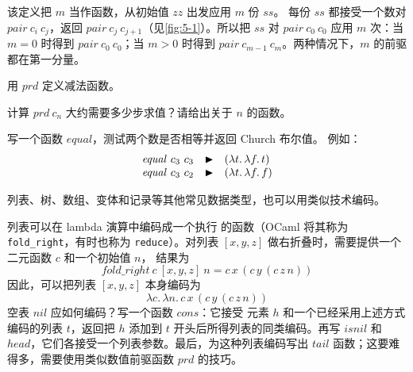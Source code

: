 该定义把 \(m\) 当作函数，从初始值 \(zz\) 出发应用 \(m\) 份 \(ss\)。
每份 \(ss\) 都接受一个数对 \(\mathit{pair}\ c_i\ c_j\)，返回
\(\mathit{pair}\ c_j\ c_{j+1}\)（见\cref{fig:5-1}）。所以把 \(ss\)
对 \(\mathit{pair}\ c_0\ c_0\) 应用 \(m\) 次：当 \(m=0\) 时得到
\(\mathit{pair}\ c_0\ c_0\)；当 \(m>0\) 时得到
\(\mathit{pair}\ c_{m-1}\ c_m\)。两种情况下，\(m\) 的前驱都在第一分量。

\begin{exercise}[\(\star\star\)]
\label{ex:5.2.5}
用 \(\mathit{prd}\) 定义减法函数。
\end{exercise}

\begin{exercise}[\(\star\star\)]
\label{ex:5.2.6}
计算 \(\mathit{prd}\ c_n\) 大约需要多少步求值？请给出关于 \(n\) 的函数。
\end{exercise}

\begin{exercise}[\(\star\star\)]
\label{ex:5.2.7}
写一个函数 \(\mathit{equal}\)，测试两个数是否相等并返回 Church 布尔值。
例如：
\[
\begin{array}{@{}l@{\quad\blacktriangleright\quad}l@{}}
 \mathit{equal}\ c_3\ c_3&(\lambda t.\,\lambda f.\,t)\\
 \mathit{equal}\ c_3\ c_2&(\lambda t.\,\lambda f.\,f)
\end{array}
\]
\end{exercise}

列表、树、数组、变体和记录等其他常见数据类型，也可以用类似技术编码。

\begin{exercise}
\label{ex:5.2.8}
列表可以在 lambda 演算中编码成一个执行
的函数（OCaml 将其称为
\texttt{fold\_right}，有时也称为 \texttt{reduce}）。对列表
\([x,y,z]\) 做右折叠时，需要提供一个二元函数 \(c\) 和一个初始值 \(n\)，
结果为
\[
 \mathit{fold\_right}\ c\ [x,y,z]\ n
 =c\,x\,(c\,y\,(c\,z\,n))
\]
因此，可以把列表 \([x,y,z]\) 本身编码为
\[
 \lambda c.\,\lambda n.\,c\,x\,(c\,y\,(c\,z\,n))
\]
空表 \(\mathit{nil}\) 应如何编码？写一个函数 \(\mathit{cons}\)：它接受
元素 \(h\) 和一个已经采用上述方式编码的列表 \(t\)，返回把 \(h\) 添加到
\(t\) 开头后所得列表的同类编码。再写 \(\mathit{isnil}\) 和
\(\mathit{head}\)，它们各接受一个列表参数。最后，为这种列表编码写出
\(\mathit{tail}\) 函数；这要难得多，需要使用类似数值前驱函数
\(\mathit{prd}\) 的技巧。
\end{exercise}


